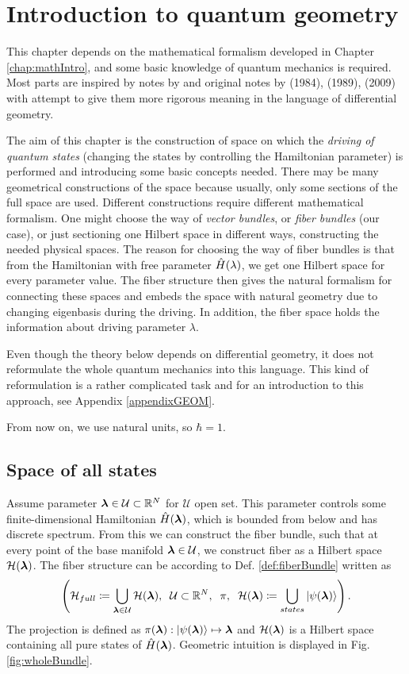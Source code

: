 \chapter{Introduction to quantum geometry}
\label{chap:driving}
This chapter depends on the mathematical formalism developed in Chapter \ref{chap:mathIntro}, and some basic knowledge of quantum mechanics is required. Most parts are inspired by notes by \citet{kolodrubez} and original notes by \citet{berry1984}(1984), \cite{berry1989}(1989), \cite{berry2009}(2009) with attempt to give them more rigorous meaning in the language of differential geometry. 

The aim of this chapter is the construction of space on which the \emph{driving of quantum states} (changing the states by controlling the Hamiltonian parameter) is performed and introducing some basic concepts needed. There may be many geometrical constructions of the space because usually, only some sections of the full space are used. Different constructions require different mathematical formalism. One might choose the way of \emph{vector bundles}, or \emph{fiber bundles} (our case), or just sectioning one Hilbert space in different ways, constructing the needed physical spaces. The reason for choosing the way of fiber bundles is that from the Hamiltonian with free parameter $\hat{H}(\lambda)$, we get one Hilbert space for every parameter value. The fiber structure then gives the natural formalism for connecting these spaces and embeds the space with natural geometry due to changing eigenbasis during the driving. In addition, the fiber space holds the information about driving parameter $\lambda$.

Even though the theory below depends on differential geometry, it does not reformulate the whole quantum mechanics into this language. This kind of reformulation is a rather complicated task and for an introduction to this approach, see Appendix \ref{appendixGEOM}.

From now on, we use natural units, so $\hbar=1$.

\section{Space of all states}
Assume parameter ${\bm\lambda}\in\mathcal{U}\subset\mathbb{R}^N$ for $\mathcal U$ open set. This parameter controls some finite-dimensional Hamiltonian $\hat{H}({\bm\lambda})$, which is bounded from below and has discrete spectrum. From this we can construct the fiber bundle, such that at every point of the base manifold ${\bm\lambda}\in \mathcal{U}$, we construct fiber as a Hilbert space $\mathcal{H}({\bm\lambda})$. The fiber structure can be according to Def. \ref{def:fiberBundle} written as
$$\left(\mathcal{H}_{full}\coloneqq \bigcup_{{\bm\lambda}\in\mathcal U} \mathcal{H}({\bm\lambda}),\;\;\mathcal{U}\subset \mathbb{R}^N,\;\;\pi,\;\; \mathcal{H}({\bm\lambda}) \coloneqq \bigcup_{states}\ket{\psi({\bm\lambda})}  \right).$$
The projection is defined as $\pi({\bm\lambda}): \ket{\psi({\bm\lambda})}\mapsto {\bm\lambda}$ and $\mathcal{H}({\bm\lambda})$ is a Hilbert space containing all pure states of $\hat{H}({\bm\lambda})$. Geometric intuition is displayed in Fig. \ref{fig:wholeBundle}.

